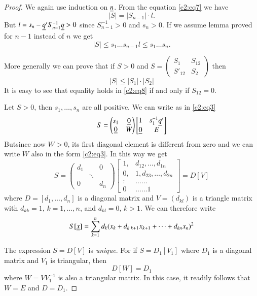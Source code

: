 \begin{proof}
We again use induction on $\underline{n}$. From the equation \eqref{c2:eq7} we have
$$
|S|=|S_{n-1}|\cdot l.
$$
But $l=s_{n}-\underline{q}'S^{-1}_{n-1}\underline{q}>0$ since $S^{-1}_{n-1}>0$ and
$s_{n}>0$. If we assume lemma proved for $n-1$ instead of $n$ we get
$$
|S|\leq s_{1}\ldots s_{n-1} l \leq s_{1}\ldots s_{n}.
$$

More generally we can prove that if $S>0$ and
$S=\left(\begin{smallmatrix} S_{1} & S_{12}\\ S'_{12} & S_{2}
\end{smallmatrix}\right)$ then
\begin{equation*}
|S|\leq |S_{1}|\cdot |S_{2}|\tag{8}\label{c2:eq8}
\end{equation*}
It is easy to see that equality holds in \eqref{c2:eq8} if and only if
$S_{12}=0$.

Let $S>0$, then $s_{1},\ldots,s_{n}$ are all positive. We can write as
in \eqref{c2:eq3}
$$
S=
\begin{pmatrix}
s_{1} & \underline{0}\\
\underline{0} & W
\end{pmatrix}
\begin{bmatrix}
1 & s^{-1}_{1}\underline{q}'\\
\underline{0} & E
\end{bmatrix}
$$
But\pageoriginale since now $W>0$, its first diagonal element is
different from zero and we can write $W$ also in the form \eqref{c2:eq3}. In this
way we get
\begin{equation*}
S=
\begin{pmatrix}
d_{1} &  & 0\\
 &\ddots &\\
0 & & d_{n}
\end{pmatrix}
\begin{bmatrix}
1, & d_{12},\ldots,d_{1n}\\
0, & 1,d_{23},\ldots,d_{2n}\\
: &\ldots\ldots\\
0 &\ldots\ldots 1
\end{bmatrix}
=D[V]\tag{9}\label{c2:eq9}
\end{equation*}
where $D=[d_{1},\ldots,d_{n}]$ is a diagonal matrix and $V=(d_{kl})$
is a triangle matrix with $d_{kk}=1$, $k=1,\ldots,n$, and $d_{kl}=0$,
$k>1$. We can therefore write
$$
S[\underline{x}]=\sum^{n}_{k=1}d_{k}(x_{k}+d_{k\;k+1}x_{k+1}+\cdots+d_{kn}x_{n})^{2}
$$

The expression $S=D[V]$ is {\em unique}. For if $S=D_{1}[V_{1}]$ where
$D_{1}$ is a diagonal matrix and $V_{1}$ is triangular, then
$$
D[W]=D_{1}
$$
where $W=VV^{-1}_{1}$ is also a triangular matrix. In this case, it
readily follows that $W=E$ and $D=D_{1}$.


\end{proof}

